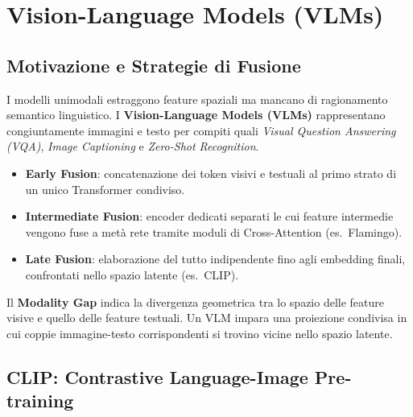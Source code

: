 \documentclass[12pt, a4paper]{report}
\begin{document}
\chapter{Vision-Language Models (VLMs)}

\section{Motivazione e Strategie di Fusione}

I modelli unimodali estraggono feature spaziali ma mancano di ragionamento semantico
linguistico. I \textbf{Vision-Language Models (VLMs)} rappresentano congiuntamente immagini
e testo per compiti quali \emph{Visual Question Answering (VQA)}, \emph{Image Captioning}
e \emph{Zero-Shot Recognition}.

\begin{propbox}
\begin{itemize}
  \item \textbf{Early Fusion}: concatenazione dei token visivi e testuali al primo strato di
        un unico Transformer condiviso.
  \item \textbf{Intermediate Fusion}: encoder dedicati separati le cui feature intermedie
        vengono fuse a metà rete tramite moduli di Cross-Attention (es.\ Flamingo).
  \item \textbf{Late Fusion}: elaborazione del tutto indipendente fino agli embedding
        finali, confrontati nello spazio latente (es.\ CLIP).
\end{itemize}
\end{propbox}

\begin{defbox}
Il \textbf{Modality Gap} indica la divergenza geometrica tra lo spazio delle feature visive
e quello delle feature testuali. Un VLM impara una proiezione condivisa in cui coppie
immagine-testo corrispondenti si trovino vicine nello spazio latente.
\end{defbox}

\section{CLIP: Contrastive Language-Image Pre-training}
\end{document}

